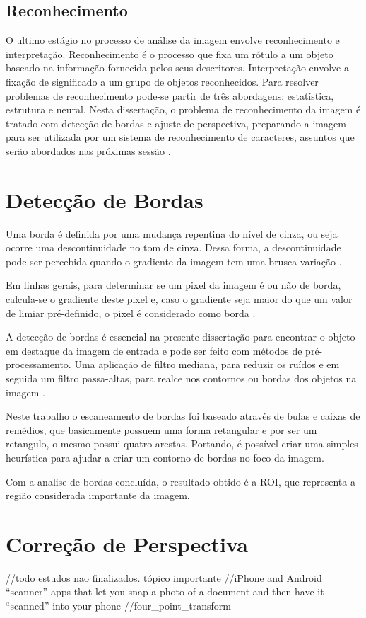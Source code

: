 \subsection{Reconhecimento}
O ultimo estágio no processo de análise da imagem envolve reconhecimento e interpretação. Reconhecimento é o processo que fixa um rótulo a um objeto baseado na informação fornecida pelos seus descritores. Interpretação envolve a fixação de significado a um grupo de objetos reconhecidos. Para resolver problemas de reconhecimento pode-se partir de três abordagens: estatística, estrutura e neural. Nesta dissertação, o problema de reconhecimento da imagem é tratado com detecção de bordas e ajuste de perspectiva, preparando a imagem para ser utilizada por um sistema de reconhecimento de caracteres, assuntos que serão abordados nas próximas sessão \cite{GONZALEZ1992}.



\section{Detecção de Bordas}

Uma borda é definida por uma mudança repentina do nível de cinza, ou seja ocorre uma descontinuidade no tom de cinza. Dessa forma, a descontinuidade pode ser percebida quando o gradiente da imagem tem uma brusca variação \cite{Antonio}. 

Em linhas gerais, para determinar se um pixel da imagem é ou não de borda, calcula-se o gradiente deste pixel e, caso o gradiente seja maior do que um valor de limiar pré-definido, o pixel é considerado como borda \cite{Silva2001}.

A detecção de bordas é essencial na presente dissertação para encontrar o objeto em destaque da imagem de entrada e pode ser feito com métodos de pré-processamento. Uma aplicação de filtro mediana, para reduzir os ruídos e em seguida um filtro passa-altas, para realce nos contornos
ou bordas dos objetos na imagem \cite{ISRAEL2003}. 

Neste trabalho o escaneamento de bordas foi baseado  através de bulas e caixas de remédios, que basicamente possuem uma forma retangular e por ser um retangulo, o mesmo possui quatro arestas. Portando, é possível criar uma simples heurística para ajudar a criar um contorno de bordas no foco da imagem. 

Com a analise de bordas concluída, o resultado obtido é a ROI, que representa a região considerada importante da imagem.




\section{Correção de Perspectiva}

//todo estudos nao finalizados. tópico importante
//iPhone and Android “scanner” apps that let you snap a photo of a document and then have it “scanned” into your phone
//four_point_transform


